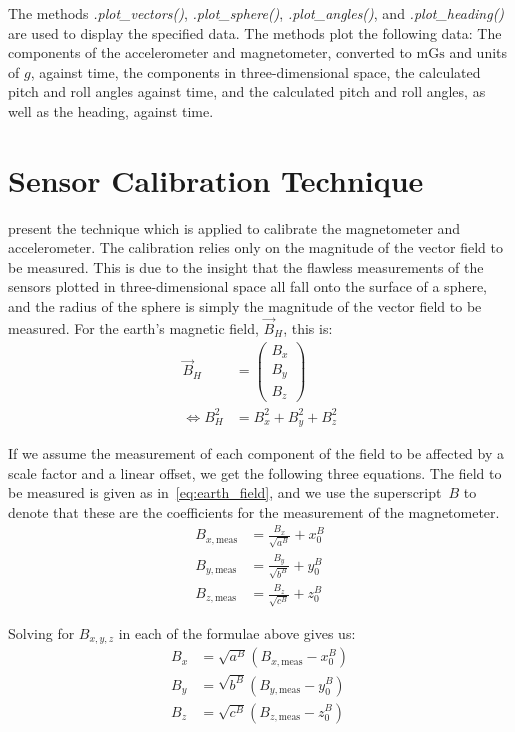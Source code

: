 The methods \textit{.plot\_vectors()}, \textit{.plot\_sphere()}, \textit{.plot\_angles()}, and \textit{.plot\_heading()} are used to display the specified data. The methods plot the following data: The components of the accelerometer and magnetometer, converted to $\mathrm{mGs}$ and units of $g$, against time, the components in three-dimensional space, the calculated pitch and roll angles against time, and the calculated pitch and roll angles, as well as the heading, against time.

\section{Sensor Calibration Technique \label{sec:meth:calibration_technique}}
\cite{non-orthonogality} present the technique which is applied to calibrate the magnetometer and accelerometer. The calibration relies only on the magnitude of the vector field to be measured. This is due to the insight that the flawless measurements of the sensors plotted in three-dimensional space all fall onto the surface of a sphere, and the radius of the sphere is simply the magnitude of the vector field to be measured. For the earth's magnetic field, $\vec{B}_H$, this is:
\begin{align}
    \vec{B}_H&=\begin{pmatrix} B_x \\ B_y \\ B_z \end{pmatrix} \label{eq:earth_field} \\
    \iff B_H^2& = B_x^2+B_y^2+B_z^2 
    \label{eq:regular_sphere}
\end{align}

If we assume the measurement of each component of the field to be affected by a scale factor and a linear offset, we get the following three equations. The field to be measured is given as in~\eqref{eq:earth_field}, and we use the superscript~$B$ to denote that these are the coefficients for the measurement of the magnetometer.
\begin{align}
    B_{x,\mathrm{meas}} &= \frac{B_x}{\sqrt{a^B}}+x_0^B \\
    B_{y,\mathrm{meas}} &= \frac{B_y}{\sqrt{b^B}}+y_0^B \\
    B_{z,\mathrm{meas}} &= \frac{B_z}{\sqrt{c^B}}+z_0^B
\end{align}

Solving for $B_{x,y,z}$ in each of the formulae above gives us:
\begin{align}
    B_x&=\sqrt{a^B}(B_{x,\mathrm{meas}}-x_0^B) \label{eq:bx} \\
    B_y&=\sqrt{b^B}(B_{y,\mathrm{meas}}-y_0^B) \label{eq:by} \\
    B_z&=\sqrt{c^B}(B_{z,\mathrm{meas}}-z_0^B) \label{eq:bz}
\end{align}

